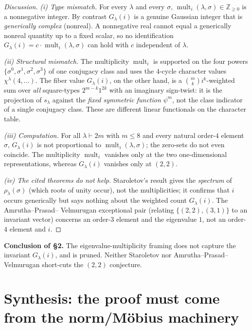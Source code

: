 \documentclass[11pt]{article}
\theoremstyle{definition}
\newcommand{\Z}{\mathbb{Z}}
\DeclareMathOperator{\mult}{mult}
\begin{document}
\begin{proof}[Discussion]
\emph{(i) Type mismatch.} For every $\lambda$ and every $\sigma$,
$\mult_i(\lambda,\sigma)\in\Z_{\ge0}$ is a nonnegative integer. By
contrast $G_\lambda(i)$ is a genuine Gaussian integer that is
\emph{generically complex} (nonreal). A nonnegative real cannot equal a
generically nonreal quantity up to a fixed scalar, so no identification
$G_\lambda(i)=c\cdot\mult_i(\lambda,\sigma)$ can hold with $c$ independent
of $\lambda$.

\emph{(ii) Structural mismatch.} The multiplicity $\mult_i$ is supported
on the four powers $\{\sigma^0,\sigma^1,\sigma^2,\sigma^3\}$ of one
conjugacy class and uses the $4$-cycle character values
$\chi^\lambda(4,\dots)$. The fiber value $G_\lambda(i)$, on the other
hand, is a $\binom{m}{k}i^k$-weighted sum over \emph{all} square-types
$2^{m-k}1^{2k}$ with an imaginary sign-twist: it is the projection of
$s_\lambda$ against the \emph{fixed symmetric function} $\psi^m$, not the
class indicator of a single conjugacy class. These are different linear
functionals on the character table.

\emph{(iii) Computation.} For all $\lambda\vdash 2m$ with $m\le 8$ and
every natural order-$4$ element $\sigma$, $G_\lambda(i)$ is not
proportional to $\mult_i(\lambda,\sigma)$; the zero-sets do not even
coincide. The multiplicity $\mult_i$ vanishes only at the two
one-dimensional representations, whereas $G_\lambda(i)$ vanishes only at
$(2,2)$.

\emph{(iv) The cited theorems do not help.} Staroletov's result gives the
\emph{spectrum} of $\rho_\lambda(\sigma)$ (which roots of unity occur),
not the multiplicities; it confirms that $i$ occurs generically but says
nothing about the weighted count $G_\lambda(i)$. The Amrutha--Prasad--%
Velmurugan exceptional pair (relating $\{(2,2),(3,1)\}$ to an invariant
vector) concerns an order-$3$ element and the eigenvalue $1$, not an
order-$4$ element and $i$.
\end{proof}

\noindent\textbf{Conclusion of \S2.} The eigenvalue-multiplicity framing
does not capture the invariant $G_\lambda(i)$, and is pruned. Neither
Staroletov nor Amrutha--Prasad--Velmurugan short-cuts the $(2,2)$
conjecture.

\section{Synthesis: the proof must come from the norm/M\"obius machinery}
\end{document}
